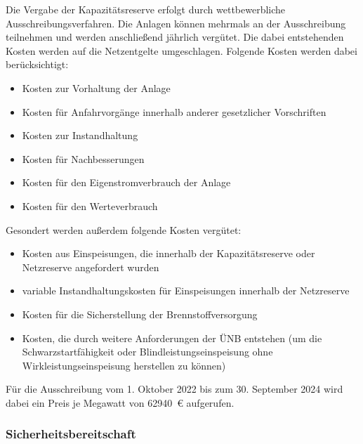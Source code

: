 			Die Vergabe der Kapazitätsreserve erfolgt durch wettbewerbliche Ausschreibungsverfahren.
			Die Anlagen können mehrmals an der Ausschreibung teilnehmen und werden anschließend jährlich vergütet.
			Die dabei entstehenden Kosten werden auf die Netzentgelte umgeschlagen. 
			Folgende Kosten werden dabei berücksichtigt: 
			\begin{itemize}
				\item Kosten zur Vorhaltung der Anlage
				\item Kosten für Anfahrvorgänge innerhalb anderer gesetzlicher Vorschriften
				\item Kosten zur Instandhaltung
				\item Kosten für Nachbesserungen
				\item Kosten für den Eigenstromverbrauch der Anlage
				\item Kosten für den Werteverbrauch
			\end{itemize}
			Gesondert werden außerdem folgende Kosten vergütet:
			\begin{itemize}
				\item Kosten aus Einspeisungen, die innerhalb der Kapazitätsreserve oder Netzreserve angefordert wurden
				\item variable Instandhaltungskosten für Einspeisungen innerhalb der Netzreserve
				\item Kosten für die Sicherstellung der Brennstoffversorgung 
				\item Kosten, die durch weitere Anforderungen der ÜNB entstehen (um die Schwarzstartfähigkeit oder Blindleistungseinspeisung ohne Wirkleistungseinspeisung herstellen zu können)
			\end{itemize}
			Für die Ausschreibung vom 1. Oktober 2022 bis zum 30. September 2024 wird dabei ein Preis je Megawatt von \SI{62940}{\euro} aufgerufen.
		
		\subsubsection{Sicherheitsbereitschaft}
		
